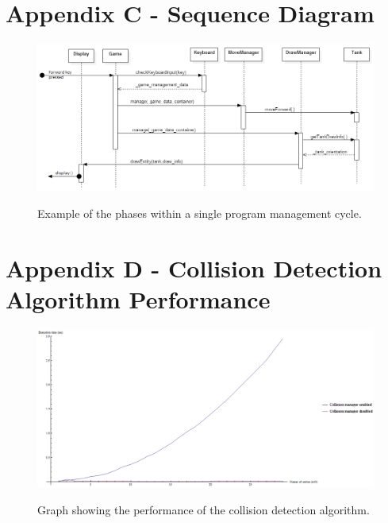 \documentclass[10pt,a4paper]{report}
\begin{document}
\newpage
\thispagestyle{empty}
\begin{landscape}
\section*{Appendix C - Sequence Diagram}

\begin{figure}[h]
	\centering
		\includegraphics[keepaspectratio=true, scale=0.73]{sequence-diagram}
	\label{top}
	\caption{Example of the phases within a single program management cycle.}
	\setcounter{figure}{0}
\end{figure}


\newpage
\thispagestyle{empty}
\section*{Appendix D - Collision Detection Algorithm Performance}

\begin{figure}[h]
	\centering
		\includegraphics[keepaspectratio=true, scale=0.6]{timing-graphs}
	\label{top}
	\caption{Graph showing the performance of the collision detection algorithm.}
	\setcounter{figure}{0}
\end{figure}

\end{landscape}
\end{document}
